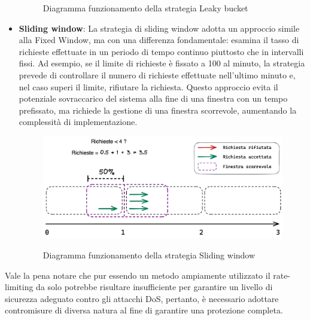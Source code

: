 \begin{itemize}
\begin{figure}[h]
        \label{fig:laky-bucket}
        \captionsetup{justification=centering}
        \caption{Diagramma funzionamento della strategia Leaky bucket}
    \end{figure}
    \item \textbf{Sliding window}: La strategia di sliding window adotta un approccio simile alla Fixed Window, ma con una differenza
    fondamentale: esamina il tasso di richieste effettuate in un periodo di tempo continuo piuttosto che in intervalli
    fissi. Ad esempio, se il limite di richieste è fissato a 100 al minuto, la strategia prevede di controllare il numero di
    richieste effettuate nell'ultimo minuto e, nel caso superi il limite, rifiutare la richiesta. Questo approccio evita il
    potenziale sovraccarico del sistema alla fine di una finestra con un tempo prefissato, ma richiede la gestione di una
    finestra scorrevole, aumentando la complessità di implementazione.
    \begin{figure}[h]
        \centering
        \includegraphics[width=13cm]{./chapters/1.state-of-art/images/4.sliding_window.png}
        \label{fig:sliding-window}
        \captionsetup{justification=centering}
        \caption{Diagramma funzionamento della strategia Sliding window}
    \end{figure}
\end{itemize}

Vale la pena notare che pur essendo un metodo ampiamente utilizzato il rate-limiting da solo potrebbe risultare
insufficiente per garantire un livello di sicurezza adeguato contro gli attacchi DoS, pertanto, è necessario adottare
contromisure di diversa natura al fine di garantire una protezione completa.